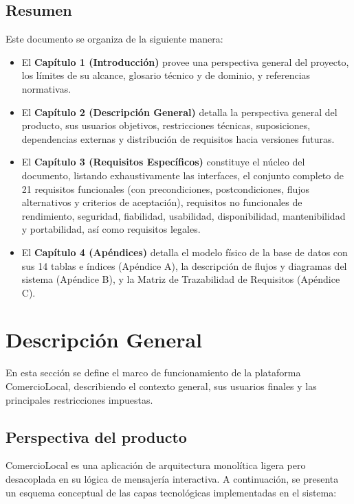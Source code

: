 \documentclass[11pt,a4paper]{report}
\begin{document}
\section{Resumen}
Este documento se organiza de la siguiente manera:
\begin{itemize}
    \item El \textbf{Capítulo 1 (Introducción)} provee una perspectiva general del proyecto, los límites de su alcance, glosario técnico y de dominio, y referencias normativas.
    \item El \textbf{Capítulo 2 (Descripción General)} detalla la perspectiva general del producto, sus usuarios objetivos, restricciones técnicas, suposiciones, dependencias externas y distribución de requisitos hacia versiones futuras.
    \item El \textbf{Capítulo 3 (Requisitos Específicos)} constituye el núcleo del documento, listando exhaustivamente las interfaces, el conjunto completo de 21 requisitos funcionales (con precondiciones, postcondiciones, flujos alternativos y criterios de aceptación), requisitos no funcionales de rendimiento, seguridad, fiabilidad, usabilidad, disponibilidad, mantenibilidad y portabilidad, así como requisitos legales.
    \item El \textbf{Capítulo 4 (Apéndices)} detalla el modelo físico de la base de datos con sus 14 tablas e índices (Apéndice A), la descripción de flujos y diagramas del sistema (Apéndice B), y la Matriz de Trazabilidad de Requisitos (Apéndice C).
\end{itemize}

\newpage

\chapter{Descripción General}

En esta sección se define el marco de funcionamiento de la plataforma ComercioLocal, describiendo el contexto general, sus usuarios finales y las principales restricciones impuestas.

\section{Perspectiva del producto}
ComercioLocal es una aplicación de arquitectura monolítica ligera pero desacoplada en su lógica de mensajería interactiva. A continuación, se presenta un esquema conceptual de las capas tecnológicas implementadas en el sistema:
\end{document}
